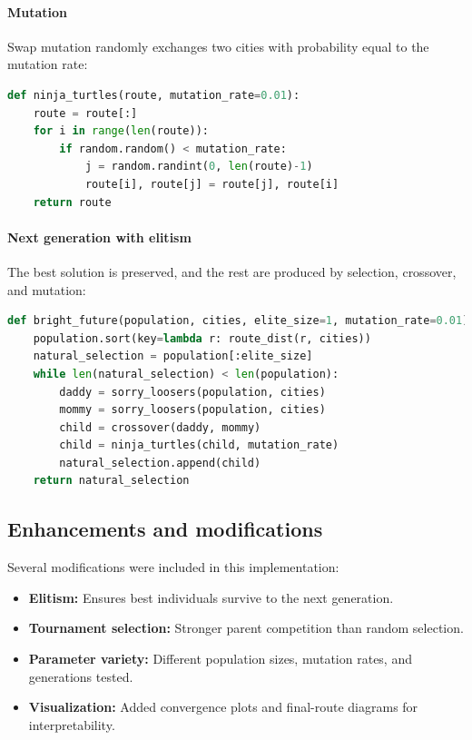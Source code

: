\documentclass[conference]{IEEEtran}
\begin{document}
\paragraph{Mutation}
Swap mutation randomly exchanges two cities with probability equal to the mutation rate:
\begin{lstlisting}[language=Python]
def ninja_turtles(route, mutation_rate=0.01):
    route = route[:]
    for i in range(len(route)):
        if random.random() < mutation_rate:
            j = random.randint(0, len(route)-1)
            route[i], route[j] = route[j], route[i]
    return route
\end{lstlisting}

\paragraph{Next generation with elitism}
The best solution is preserved, and the rest are produced by selection, crossover, and mutation:
\begin{lstlisting}[language=Python]
def bright_future(population, cities, elite_size=1, mutation_rate=0.01):
    population.sort(key=lambda r: route_dist(r, cities))
    natural_selection = population[:elite_size]
    while len(natural_selection) < len(population):
        daddy = sorry_loosers(population, cities)
        mommy = sorry_loosers(population, cities)
        child = crossover(daddy, mommy)
        child = ninja_turtles(child, mutation_rate)
        natural_selection.append(child)
    return natural_selection
\end{lstlisting}

\subsection{Enhancements and modifications}
Several modifications were included in this implementation:
\begin{itemize}
    \item \textbf{Elitism:} Ensures best individuals survive to the next generation.
    \item \textbf{Tournament selection:} Stronger parent competition than random selection.
    \item \textbf{Parameter variety:} Different population sizes, mutation rates, and generations tested.
    \item \textbf{Visualization:} Added convergence plots and final-route diagrams for interpretability.
\end{itemize}
\end{document}
